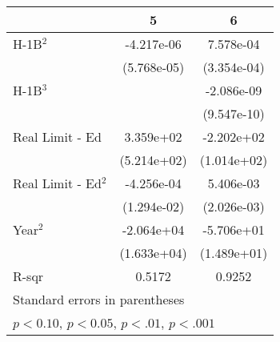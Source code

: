 
\begin{tabular}{l*{2}{c}}
    \toprule
                             &\multicolumn{1}{c}{5}&\multicolumn{1}{c}{6}\\
    \midrule
    H-1B$^2$                   &  -4.217e-06        &   7.578e-04\sym{++}\\
                             & (5.768e-05)        & (3.354e-04)        \\
    \addlinespace
    H-1B$^3$                   &                    &  -2.086e-09\sym{++}\\
                             &                    & (9.547e-10)        \\
    \addlinespace
    Real Limit - Ed          &   3.359e+02        &  -2.202e+02\sym{+} \\
                             & (5.214e+02)        & (1.014e+02)        \\
    \addlinespace
    Real Limit - Ed$^2$        &  -4.256e-04        &   5.406e-03\sym{++}\\
                             & (1.294e-02)        & (2.026e-03)        \\
    \addlinespace
    Year$^2$                   &  -2.064e+04        &  -5.706e+01\sym{*} \\
                             & (1.633e+04)        & (1.489e+01)        \\
    \midrule
    R-sqr                    &      0.5172        &      0.9252        \\
    \bottomrule
    \multicolumn{3}{l}{\footnotesize Standard errors in parentheses}\\
    \multicolumn{3}{l}{\footnotesize \sym{+} \(p<0.10\), \sym{++} \(p<0.05\), \sym{*} \(p<.01\), \sym{**} \(p<.001\)}\\
    \end{tabular}
